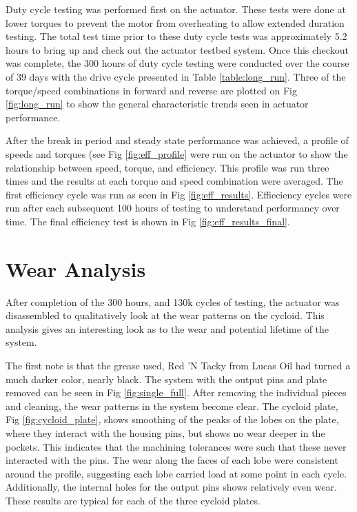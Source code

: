 Duty cycle testing was performed first on the actuator.
These tests were done at lower torques to prevent the motor from overheating to allow extended duration testing.
The total test time prior to these duty cycle tests was approximately 5.2 hours to bring up and check out the actuator testbed system.
Once this checkout was complete, the 300 hours of duty cycle testing were conducted over the course of 39  days with the drive cycle presented in Table \ref{table:long_run}.
Three of the torque/speed combinations in forward and reverse are plotted on Fig \ref{fig:long_run} to show the general characteristic trends seen in actuator performance.

After the break in period and steady state performance was achieved, a profile of speeds and torques (see Fig \ref{fig:eff_profile} were run on the actuator to show the relationship between speed, torque, and efficiency.
This profile was run three times and the results at each torque and speed combination were averaged. The first efficiency cycle was run as seen in Fig \ref{fig:eff_results}. Effieciency cycles were run after each subsequent 100 hours of testing to understand performancy over time. The final efficiency test is shown in Fig \ref{fig:eff_results_final}.

\section{Wear Analysis} \label{ch:single:wear_analysis}

After completion of the 300 hours, and 130k cycles of testing, the actuator was disassembled to qualitatively look at the wear patterns on the cycloid. This analysis gives an interesting look as to the wear and potential lifetime of the system. 

The first note is that the grease used, Red 'N Tacky from Lucas Oil had turned a much darker color, nearly black. The system with the output pins and plate removed can be seen in Fig \ref{fig:single_full}. After removing the individual pieces and cleaning, the wear patterns in the system become clear. The cycloid plate, Fig \ref{fig:cycloid_plate}, shows smoothing of the peaks of the lobes on the plate, where they interact with the housing pins, but shows no wear deeper in the pockets. This indicates that the machining tolerances were such that these never interacted with the pins. The wear along the faces of each lobe were consistent around the profile, suggesting each lobe carried load at some point in each cycle. Additionally, the internal holes for the output pins shows relatively even wear. These results are typical for each of the three cycloid plates. 

